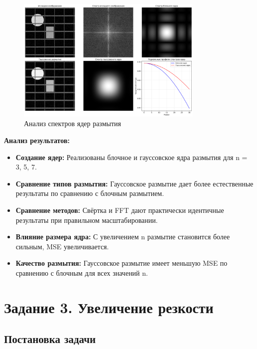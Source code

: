 \begin{figure}[H]
    \centering
    \includegraphics[width=0.8\textwidth]{images/task2/spectrum_analysis.png}
    \caption{Анализ спектров ядер размытия}
    \label{fig:spectrum_analysis_blur}
\end{figure}

\textbf{Анализ результатов:}
\begin{itemize}
    \item \textbf{Создание ядер:} Реализованы блочное и гауссовское ядра размытия для n = 3, 5, 7.
    
    \item \textbf{Сравнение типов размытия:} Гауссовское размытие дает более естественные результаты по сравнению с блочным размытием.
    
    \item \textbf{Сравнение методов:} Свёртка и FFT дают практически идентичные результаты при правильном масштабировании.
    
    \item \textbf{Влияние размера ядра:} С увеличением n размытие становится более сильным, MSE увеличивается.
    
    \item \textbf{Качество размытия:} Гауссовское размытие имеет меньшую MSE по сравнению с блочным для всех значений n.
\end{itemize}

\section*{Задание 3. Увеличение резкости}

\subsection*{Постановка задачи}

